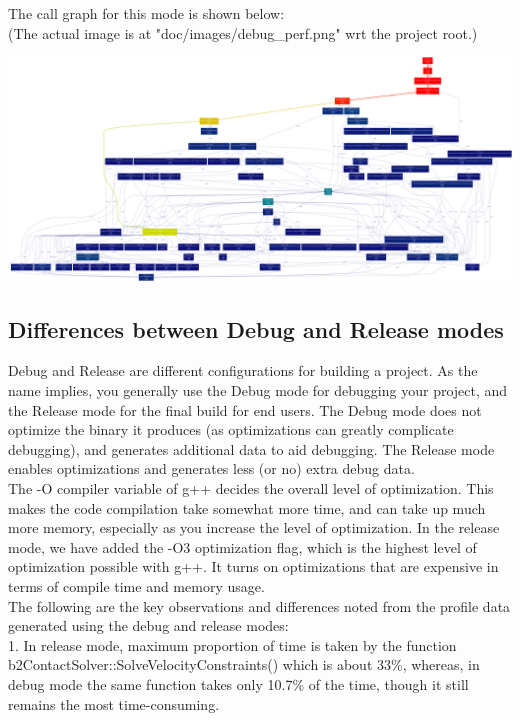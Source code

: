 \documentclass[11pt]{article}
\begin{document}
The call graph for this mode is shown below: \\
(The actual image is at "doc/images/debug\_perf.png" wrt the project root.)

\begin{center} 
\includegraphics [scale=0.07]{./images/debug_perf} 
\end{center}

\subsection{Differences between Debug and Release modes}
Debug and Release are different configurations for building a project. As the name implies, you generally use the Debug mode for debugging your project, and the Release mode for the final build for end users. The Debug mode does not optimize the binary it produces (as optimizations can greatly complicate debugging), and generates additional data to aid debugging. The Release mode enables optimizations and generates less (or no) extra debug data. \\
The -O compiler variable of g++ decides the overall level of optimization. This makes the code compilation take somewhat more time, and can take up much more memory, especially as you increase the level of optimization. 
In the release mode, we have added the -O3 optimization flag, which is the highest level of optimization possible with g++. It turns on optimizations that are expensive in terms of compile time and memory usage. \\
The following are the key observations and differences noted from the profile data generated using the debug and release modes:  \\

1. In release mode, maximum proportion of time is taken by the function \\ b2ContactSolver::SolveVelocityConstraints() which is about 33\%, whereas, in debug mode the same function takes only 10.7\% of the time, though it still remains the most time-consuming. \\
\end{document}
